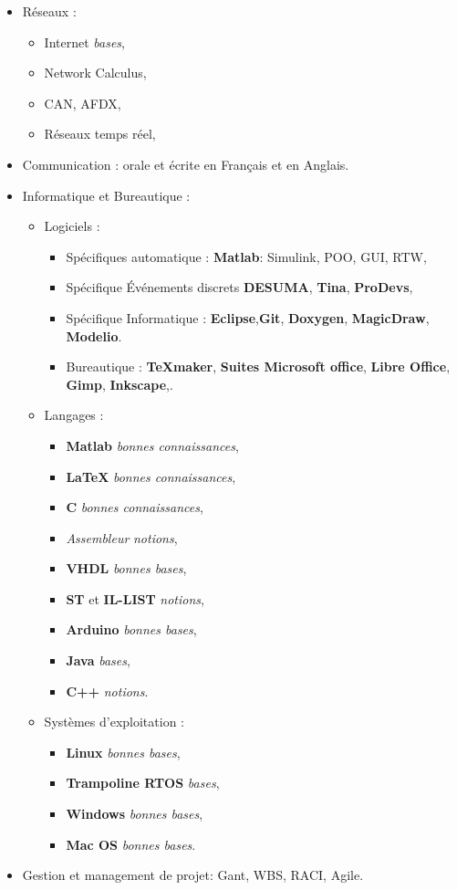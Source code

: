 \documentclass{article}
\begin{document}
\begin{itemize}
\item Réseaux :
	\begin{itemize}
	\item Internet \textit{bases},
	\item Network Calculus,
	\item CAN, AFDX,
	\item Réseaux temps réel, 	
	\end{itemize}


\item Communication : orale et écrite en Français et en Anglais. 

\item Informatique et Bureautique : 
	\begin{itemize}
	\item Logiciels : 
		\begin{itemize}
		\item Spécifiques automatique : \textbf{Matlab}: Simulink, POO, GUI, RTW, 
		\item Spécifique Événements discrets  \textbf{DESUMA}, \textbf{Tina}, \textbf{ProDevs}, 
		\item Spécifique Informatique : \textbf{Eclipse},\textbf{Git}, \textbf{Doxygen}, \textbf{MagicDraw}, \textbf{Modelio}.
		\item Bureautique : \textbf{\TeX maker}, \textbf{Suites Microsoft office}, \textbf{Libre Office}, \textbf{Gimp}, \textbf{Inkscape},.
		\end{itemize}
	
	\item Langages : 
		\begin{itemize}
		\item 	\textbf{Matlab} \textit{bonnes connaissances}, 
		\item \textbf{\LaTeX}  \textit{bonnes connaissances},
		\item \textbf{C} \textit{bonnes connaissances}, 
		\item \textit{Assembleur} \textit{notions},
		\item \textbf{VHDL} \textit{bonnes bases}, 
		\item \textbf{ST} et \textbf{IL-LIST} \textit{notions}, 
		\item \textbf{Arduino} \textit{bonnes bases},
		\item \textbf{Java} \textit{bases}, 		
		\item \textbf{C++} \textit{notions}.
		\end{itemize}
		
	\item Systèmes d'exploitation :
		\begin{itemize}
		\item \textbf{Linux} \textit{bonnes bases},
		\item \textbf{Trampoline RTOS} \textit{bases}, 
		\item \textbf{Windows} \textit{bonnes bases},
		\item \textbf{Mac OS} \textit{bonnes bases}.
		\end{itemize}
	\end{itemize}		
\item Gestion et management de projet: Gant, WBS, RACI, Agile.

\end{itemize}
\end{document}
